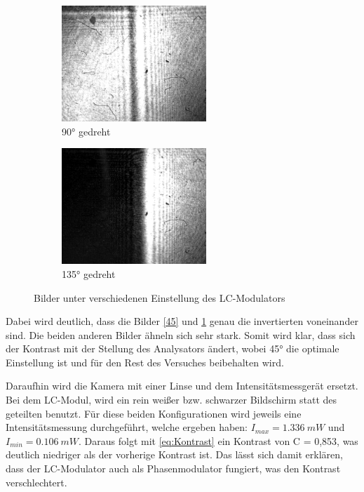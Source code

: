 \begin{figure}
	\begin{subfigure}[]{0.5\textwidth}
		\includegraphics[width=0.6\textwidth]{4.1.2_90Grad.png}
		\caption{90° gedreht}
	\end{subfigure}
	\begin{subfigure}[]{0.5\textwidth}
		\includegraphics[width=0.6\textwidth]{4.1.2_135Grad.png}
		\caption{135° gedreht}
		\label{135}
	\end{subfigure}
	\caption{Bilder unter verschiedenen Einstellung des LC-Modulators}
	\label{Kontrast}
\end{figure}

Dabei wird deutlich, dass die Bilder \cref{45} und \cref{135} genau die invertierten voneinander sind. Die beiden anderen Bilder ähneln sich sehr stark. Somit wird klar, dass sich der Kontrast mit der Stellung des Analysators ändert, wobei 45° die optimale Einstellung ist und für den Rest des Versuches beibehalten wird. 

Daraufhin wird die Kamera mit einer Linse und dem Intensitätsmessgerät ersetzt. Bei dem LC-Modul, wird ein rein weißer bzw. schwarzer Bildschirm statt des geteilten benutzt. Für diese beiden Konfigurationen wird jeweils eine Intensitätsmessung durchgeführt, welche ergeben haben: $I_{max} = \SI{1,336}{mW}$ und $I_{min} = \SI{0,106}{mW}$. Daraus folgt mit \cref{eq:Kontrast} ein Kontrast von C = 0,853, was deutlich niedriger als der vorherige Kontrast ist. 
Das lässt sich damit erklären, dass der LC-Modulator auch als Phasenmodulator fungiert, was den Kontrast verschlechtert.
